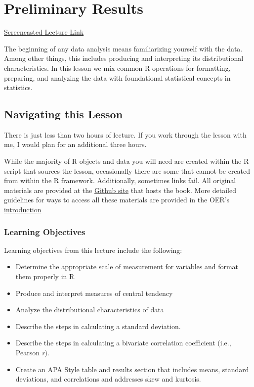 \documentclass[
  11pt,
]{book}
\providecommand{\tightlist}{%
  \setlength{\itemsep}{0pt}\setlength{\parskip}{0pt}}
\begin{document}
\hypertarget{preliminaries}{%
\chapter{Preliminary Results}\label{preliminaries}}

\href{https://spu.hosted.panopto.com/Panopto/Pages/Viewer.aspx?pid=97ec1420-3527-4204-8521-aeff0000afed}{Screencasted Lecture Link}

The beginning of any data analysis means familiarizing yourself with the data. Among other things, this includes producing and interpreting its distributional characteristics. In this lesson we mix common R operations for formatting, preparing, and analyzing the data with foundational statistical concepts in statistics.

\hypertarget{navigating-this-lesson-1}{%
\section{Navigating this Lesson}\label{navigating-this-lesson-1}}

There is just less than two hours of lecture. If you work through the lesson with me, I would plan for an additional three hours.

While the majority of R objects and data you will need are created within the R script that sources the lesson, occasionally there are some that cannot be created from within the R framework. Additionally, sometimes links fail. All original materials are provided at the \href{https://github.com/lhbikos/ReCenterPsychStats}{Github site} that hosts the book. More detailed guidelines for ways to access all these materials are provided in the OER's \protect\hyperlink{ReCintro}{introduction}

\hypertarget{learning-objectives-1}{%
\subsection{Learning Objectives}\label{learning-objectives-1}}

Learning objectives from this lecture include the following:

\begin{itemize}
\tightlist
\item
  Determine the appropriate scale of measurement for variables and format them properly in R
\item
  Produce and interpret measures of central tendency
\item
  Analyze the distributional characteristics of data
\item
  Describe the steps in calculating a standard deviation.
\item
  Describe the steps in calculating a bivariate correlation coefficient (i.e., Pearson \emph{r}).
\item
  Create an APA Style table and results section that includes means, standard deviations, and correlations and addresses skew and kurtosis.
\end{itemize}
\end{document}

